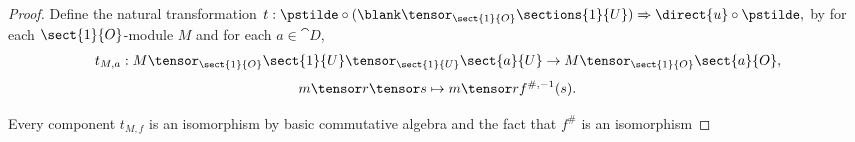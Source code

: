
\begin{proof}
Define the natural transformation
$t: \pstilde \circ (\blank \tensor_{\sect{1}{O}} \sections{1}{U}) \Rightarrow \direct{u} \circ \pstilde,$
by 
for each $\sect{1}{O}$-module $M$
and for each $a \in \cat{D}$,
\[t_{M,a}: M \tensor_{\sect{1}{O}} \sect{1}{U} \tensor_{\sect{1}{U}} \sect{a}{U}  
	\rightarrow  M \tensor_{\sect{1}{O}} \sect{a}{O} ,\]
\[m\tensor r \tensor s \mapsto m \tensor rf^{\#,-1}(s).\]

Every component $t_{M,f}$ is an isomorphism by basic commutative algebra and 
the fact that $f^{\#}$ is an isomorphism
\end{proof}

